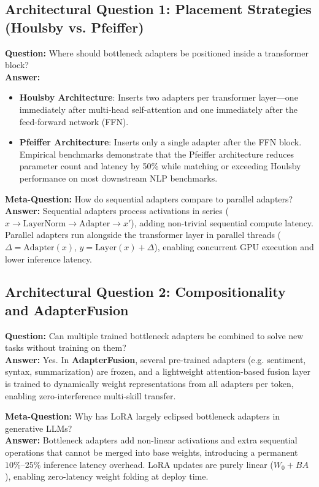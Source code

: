\documentclass[11pt,a4paper]{article}
\theoremstyle{definition}
\begin{document}
\subsection{Architectural Question 1: Placement Strategies (Houlsby vs. Pfeiffer)}
\textbf{Question:} Where should bottleneck adapters be positioned inside a transformer block?\\
\textbf{Answer:} 
\begin{itemize}
    \item \textbf{Houlsby Architecture}: Inserts two adapters per transformer layer—one immediately after multi-head self-attention and one immediately after the feed-forward network (FFN).
    \item \textbf{Pfeiffer Architecture}: Inserts only a single adapter after the FFN block. Empirical benchmarks demonstrate that the Pfeiffer architecture reduces parameter count and latency by 50\% while matching or exceeding Houlsby performance on most downstream NLP benchmarks.
\end{itemize}

\textbf{Meta-Question:} How do sequential adapters compare to parallel adapters?\\
\textbf{Answer:} Sequential adapters process activations in series ($x \to \text{LayerNorm} \to \text{Adapter} \to x'$), adding non-trivial sequential compute latency. Parallel adapters run alongside the transformer layer in parallel threads ($\Delta = \text{Adapter}(x)$, $y = \text{Layer}(x) + \Delta$), enabling concurrent GPU execution and lower inference latency.

\subsection{Architectural Question 2: Compositionality and AdapterFusion}
\textbf{Question:} Can multiple trained bottleneck adapters be combined to solve new tasks without training on them?\\
\textbf{Answer:} Yes. In \textbf{AdapterFusion}, several pre-trained adapters (e.g. sentiment, syntax, summarization) are frozen, and a lightweight attention-based fusion layer is trained to dynamically weight representations from all adapters per token, enabling zero-interference multi-skill transfer.

\textbf{Meta-Question:} Why has LoRA largely eclipsed bottleneck adapters in generative LLMs?\\
\textbf{Answer:} Bottleneck adapters add non-linear activations and extra sequential operations that cannot be merged into base weights, introducing a permanent $10\%\text{--}25\%$ inference latency overhead. LoRA updates are purely linear ($W_0 + BA$), enabling zero-latency weight folding at deploy time.
\end{document}
